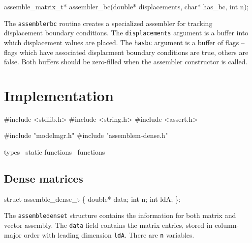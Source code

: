 \nwenddocs{}\plusendmoddef
assemble_matrix_t* assembler_bc(double* displacements, char* has_bc, int n);
\nwendcode{}\nwdocspar

The {\tt{}assembler{}bc} routine creates a specialized assembler for
tracking displacement boundary conditions.  The {\tt{}displacements}
argument is a buffer into which displacement values are placed.
The {\tt{}has{}bc} argument is a buffer of flags -- flags which have
associated displacment boundary conditions are true, others are false.
Both buffers should be zero-filled when the assembler constructor
is called.


\section{Implementation}

\nwenddocs{}\endmoddef
#include <stdlib.h>
#include <string.h>
#include <assert.h>

#include "modelmgr.h"
#include "assemblem-dense.h"

\LA{}types~{\nwtagstyle{}}\RA{}
\LA{}static functions~{\nwtagstyle{}}\RA{}
\LA{}functions~{\nwtagstyle{}}\RA{}
\nwendcode{}\nwdocspar


\subsection{Dense matrices}

\nwenddocs{}\endmoddef
struct assemble_dense_t \{
    double* data;
    int     n;
    int     ldA;
\};

\nwendcode{}\nwdocspar

The {\tt{}assemble{}dense{}t} structure contains the information for both matrix
and vector assembly.  The {\tt{}data} field contains the matrix entries,
stored in column-major order with leading dimension {\tt{}ldA}.  There are
{\tt{}n} variables.

